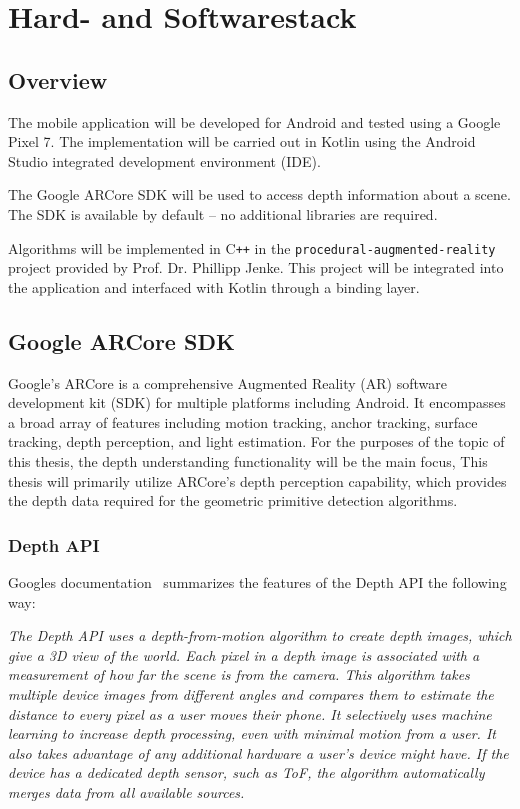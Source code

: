 \chapter{Hard- and Softwarestack}\label{ch:hardware-and-softwarestack}


\section{Overview}\label{sec:overview}

The mobile application will be developed for Android and tested using a Google Pixel 7.
The implementation will be carried out in Kotlin using the Android Studio integrated development environment (IDE).

The Google ARCore SDK will be used to access depth information about a scene.
The SDK is available by default -- no additional libraries are required.

Algorithms will be implemented in C\texttt{++} in the \texttt{procedural-augmented-reality} project provided by Prof. Dr. Phillipp Jenke.
This project will be integrated into the application and interfaced with Kotlin through a binding layer.


\section{Google ARCore SDK}

Google's ARCore is a comprehensive Augmented Reality (AR) software development kit (SDK)  for multiple platforms including Android.
It encompasses a broad array of features including motion tracking, anchor tracking, surface tracking, depth perception, and light estimation.
\parencite{arcore}
For the purposes of the topic of this thesis, the depth understanding functionality will be the main focus,
This thesis will primarily utilize ARCore's depth perception capability,
which provides the depth data required for the geometric primitive detection algorithms.

\subsection{Depth API}
Googles documentation~\parencite{arcore-doc-depth} summarizes the features of the Depth API the following way:

\textit{
    The Depth API uses a depth-from-motion algorithm to create depth images, which give a 3D view of the world.
    Each pixel in a depth image is associated with a measurement of how far the scene is from the camera.
    This algorithm takes multiple device images from different angles and compares them to estimate the distance to every pixel as a user moves their phone.
    It selectively uses machine learning to increase depth processing, even with minimal motion from a user.
    It also takes advantage of any additional hardware a user’s device might have.
    If the device has a dedicated depth sensor, such as ToF, the algorithm automatically merges data from all available sources.
}

